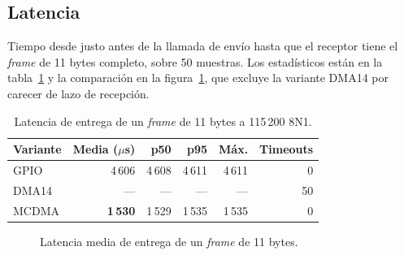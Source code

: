 \subsection{Latencia}

Tiempo desde justo antes de la llamada de envío hasta que el receptor tiene el \textit{frame} de 11 bytes
completo, sobre 50 muestras. Los estadísticos están en la tabla~\ref{tab:bench_latencia} y la
comparación en la figura~\ref{fig:bench_latencia}, que excluye la variante DMA14 por carecer de
lazo de recepción.

\begin{table}[H]
    \centering
    \begin{tabular}{lrrrrr}
        \hline
        \textbf{Variante} & \textbf{Media ($\mu$s)} & \textbf{p50} & \textbf{p95} & \textbf{Máx.} & \textbf{Timeouts} \\
        \hline
        GPIO  & 4\,606 & 4\,608 & 4\,611 & 4\,611 & 0 \\
        DMA14 & --- & --- & --- & --- & 50 \\
        MCDMA & \textbf{1\,530} & 1\,529 & 1\,535 & 1\,535 & 0 \\
        \hline
    \end{tabular}
    \caption{Latencia de entrega de un \textit{frame} de 11 bytes a 115\,200 8N1.}
    \label{tab:bench_latencia}
\end{table}

\begin{figure}[htbp]
    \centering
    \caption{Latencia media de entrega de un \textit{frame} de 11 bytes.}
    \label{fig:bench_latencia}
\end{figure}


